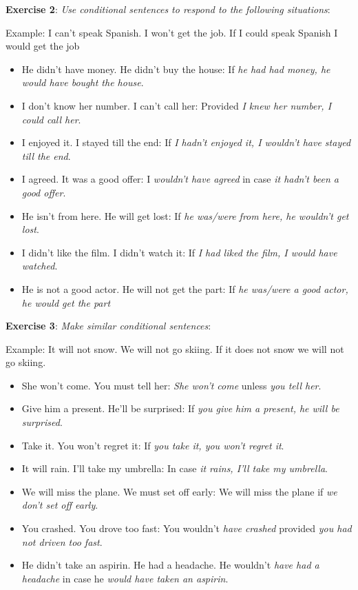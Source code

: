 \textbf{Exercise 2}: \textit{Use conditional sentences to respond to the following situations}:

Example:
I can't speak Spanish. I won't get the job.
If I could speak Spanish I would get the job

\begin{itemize}

\item He didn't have money. He didn't buy the house: If \textit{he had had money, he would have bought the house}.
\item I don't know her number. I can't call her: Provided \textit{I knew her number, I could call her}.
\item I enjoyed it. I stayed till the end: If \textit{I hadn't enjoyed it, I wouldn't have stayed till the end}.
\item I agreed. It was a good offer: I \textit{wouldn't have agreed} in case \textit{it hadn't been a good offer}.
\item He isn't from here. He will get lost: If \textit{he was/were from here, he wouldn't get lost}.
\item I didn't like the film. I didn't watch it: If \textit{I had liked the film, I would have watched}.
\item He is not a good actor. He will not get the part: If \textit{he was/were a good actor, he would get the part}

\end{itemize}

\textbf{Exercise 3}: \textit{Make similar conditional sentences}:

Example:
It will not snow. We will not go skiing.
If it does not snow we will not go skiing.

\begin{itemize}

\item She won't come. You must tell her: \textit{She won't come} unless \textit{you tell her}.
\item Give him a present. He'll be surprised: If \textit{you give him a present, he will be surprised}.
\item Take it. You won't regret it: If \textit{you take it, you won't regret it}.
\item It will rain. I'll take my umbrella: In case \textit{it rains, I'll take my umbrella}.
\item We will miss the plane. We must set off early: We will miss the plane if \textit{we don't set off early}.
\item You crashed. You drove too fast: You wouldn't \textit{have crashed} provided \textit{you had not driven too fast}.
\item He didn't take an aspirin. He had a headache. He wouldn't \textit{have had a headache} in case he \textit{would have taken an aspirin}.

\end{itemize}

